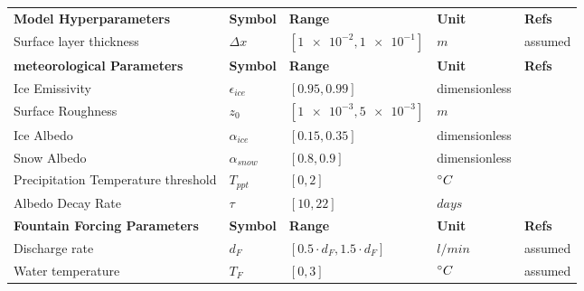 \begin{table}
\begin{tabular}{lllll}
		\textbf{Model Hyperparameters}       & \textbf{Symbol}  & \textbf{Range}                      & \textbf{Unit}                 & \textbf{Refs}                                          \\
		Surface layer thickness              & $\Delta x$       & $[\num{1e-2},\num{1e-1}]$           & $m$                           & assumed
		\\\midrule
		\textbf{meteorological Parameters}   & \textbf{Symbol}  & \textbf{Range}                      & \textbf{Unit}                 & \textbf{Refs}                                          \\
		Ice Emissivity                       & $\epsilon_{ice}$ & $[0.95,0.99]$                       & dimensionless                 & \cite{horiInsituMeasuredSpectral2006}                  \\
		Surface Roughness                    & $z_0$            & $[\num{1e-3},\num{5e-3}]$           & $m$                           & \cite{brockMeasurementParameterizationAerodynamic2006} \\
		Ice Albedo                           & $\alpha_{ice}$   & $[0.15,0.35]$                       & dimensionless                 &
		\cite{steinerModellingIcecliffBackwasting2015, zollesRobustUncertaintyAssessment2019}                                                                                                  \\
		Snow Albedo                          & $\alpha_{snow}$  & $[0.8,0.9]$                         & dimensionless                 & \cite{zollesRobustUncertaintyAssessment2019}           \\
		Precipitation Temperature threshold  & $T_{ppt}$        & $[0,2]$                             & $^{\circ} C$                   & \cite{shichangResponseZhadangGlacier2010}              \\
		Albedo Decay Rate                    & $\tau$           & $[10,22]$                           & $days$                        &
		\cite{schmidtImportanceAccurateGlacier2017, oerlemansYearRecordGlobal1998}                                                                                                             \\\midrule
		\textbf{Fountain Forcing Parameters} & \textbf{Symbol}  & \textbf{Range}                      & \textbf{Unit}                 & \textbf{Refs}                                          \\
		Discharge rate                       & $d_{F}$          & $[0.5 \cdot d_{F},1.5 \cdot d_{F}]$ & $l/min$                       & assumed                                                \\
		Water temperature                    & $T_{F}$          & $[0,3]$                             & $^{\circ} C$                   & assumed                                                \\\bottomrule
	\end{tabular}
\end{table}

